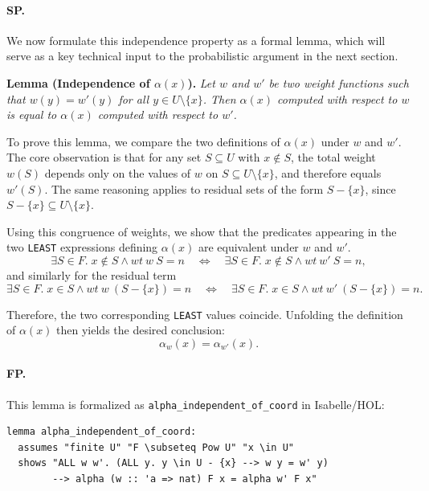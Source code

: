 \paragraph{SP.}
We now formulate this independence property as a formal lemma, which will serve as a key technical input to the probabilistic argument in the next section.

\noindent
\textbf{Lemma (Independence of $\alpha(x)$).}
\emph{Let $w$ and $w'$ be two weight functions such that $w(y) = w'(y)$ for all $y \in U \setminus \{x\}$.
Then $\alpha(x)$ computed with respect to $w$ is equal to $\alpha(x)$ computed with respect to $w'$.}

To prove this lemma, we compare the two definitions of $\alpha(x)$ under $w$ and $w'$.
The core observation is that for any set $S \subseteq U$ with $x \notin S$, the total weight $w(S)$ depends only on the values of $w$ on $S \subseteq U \setminus \{x\}$, and therefore equals $w'(S)$.
The same reasoning applies to residual sets of the form $S - \{x\}$, since $S - \{x\} \subseteq U \setminus \{x\}$.

Using this congruence of weights, we show that the predicates appearing in the two \texttt{LEAST} expressions defining $\alpha(x)$ are equivalent under $w$ and $w'$.
\[
\exists S\in F.\; x\notin S \land wt\ w\ S = n
\quad\Longleftrightarrow\quad
\exists S\in F.\; x\notin S \land wt\ w'\ S = n,
\]
and similarly for the residual term
\[
\exists S\in F.\; x\in S \land wt\ w\ (S-\{x\}) = n
\quad\Longleftrightarrow\quad
\exists S\in F.\; x\in S \land wt\ w'\ (S-\{x\}) = n.
\]

Therefore, the two corresponding \texttt{LEAST} values coincide.
Unfolding the definition of $\alpha(x)$ then yields the desired conclusion:
\[
\alpha_w(x) = \alpha_{w'}(x).
\]

\paragraph{FP.}
This lemma is formalized as \texttt{alpha\_independent\_of\_coord} in Isabelle/HOL:

\listingneedspace
\begin{lstlisting}[language=Isabelle, caption={Independence of alpha(x) from the x-coordinate}]
lemma alpha_independent_of_coord:
  assumes "finite U" "F \subseteq Pow U" "x \in U"
  shows "ALL w w'. (ALL y. y \in U - {x} --> w y = w' y)
        --> alpha (w :: 'a => nat) F x = alpha w' F x"
\end{lstlisting}

